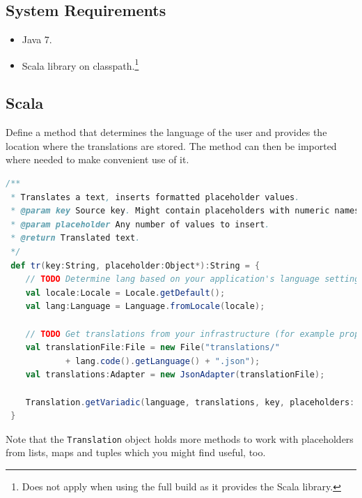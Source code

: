 \documentclass[a4paper,11pt,twoside]{report}
\begin{document}
\subsection{System Requirements}
\begin{itemize}
	\item Java 7.
	\item Scala library on classpath.\footnote{Does not apply when using the full build as it provides the Scala library.}
\end{itemize}

\subsection{Scala}\label{sec:scala-translation-function}
Define a method that determines the language of the user and provides the location where the translations are stored. The method can then be imported where needed to make convenient use of it.
\begin{lstlisting}[language=Scala]
/**
 * Translates a text, inserts formatted placeholder values.
 * @param key Source key. Might contain placeholders with numeric names.
 * @param placeholder Any number of values to insert.
 * @return Translated text.
 */
 def tr(key:String, placeholder:Object*):String = {
	// TODO Determine lang based on your application's language settings.
	val locale:Locale = Locale.getDefault();
	val lang:Language = Language.fromLocale(locale);

	// TODO Get translations from your infrastructure (for example property file, database).
	val translationFile:File = new File("translations/"
			+ lang.code().getLanguage() + ".json");
	val translations:Adapter = new JsonAdapter(translationFile);
	
	Translation.getVariadic(language, translations, key, placeholders: _*)
 }
\end{lstlisting}
Note that the \lstinline$Translation$ object holds more methods to work with placeholders from lists, maps and tuples which you might find useful, too.
\end{document}
